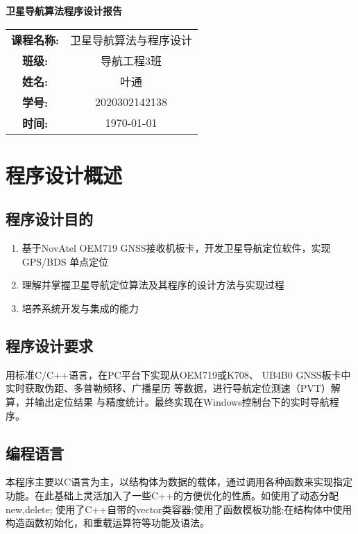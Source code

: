 \documentclass{ctexart}
\begin{document}
\newpage
\thispagestyle{empty}
    \begin{center}
        \Huge\textbf{卫星导航算法程序设计报告}
    \end{center}
\vspace*{\fill}

\begin{table}[h]
    \centering
    \large
    \begin{tabular}{cc}
    \textbf{课程名称:} & 卫星导航算法与程序设计 \\ \cline{2-2}
    \textbf{班级:} & 导航工程3班 \\ \cline{2-2}
    \textbf{姓名:} & 叶通 \\  \cline{2-2}
    \textbf{学号:} & 2020302142138 \\ \cline{2-2}
    \textbf{时间:} & \today \\ \cline{2-2}
    \end{tabular}
\end{table}

\newpage
{}
\setcounter{page}{1}
\tableofcontents

\newpage
\setcounter{page}{1}

\section{程序设计概述}
\subsection{程序设计目的}
\begin{enumerate}[(1)]
\item 基于NovAtel OEM719 GNSS接收机板卡，开发卫星导航定位软件，实现GPS/BDS
单点定位
\item 理解并掌握卫星导航定位算法及其程序的设计方法与实现过程
\item 培养系统开发与集成的能力
\end{enumerate}
\subsection{程序设计要求}
\label{1.2}
用标准C/C++语言，在PC平台下实现从OEM719或K708、
UB4B0 GNSS板卡中实时获取伪距、多普勒频移、广播星历
等数据，进行导航定位测速（PVT）解算，并输出定位结果
与精度统计。最终实现在Windows控制台下的实时导航程序。
\subsection{编程语言}
本程序主要以C语言为主，以结构体为数据的载体，通过调用各种函数来实现指定功能。在此基础上灵活加入了一些C++的方便优化的性质。如使用了动态分配new,delete;
使用了C++自带的vector类容器;使用了函数模板功能;在结构体中使用构造函数初始化，和重载运算符等功能及语法。
\end{document}
